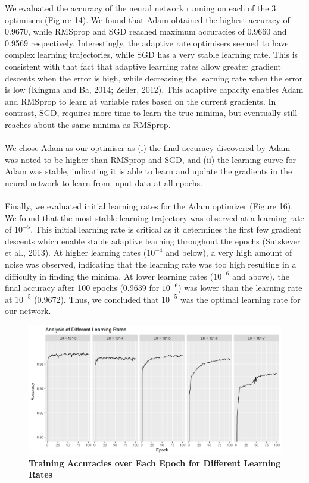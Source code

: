 \documentclass{article}
\begin{document}
We evaluated the accuracy of the neural network running on each of the 3 optimisers (Figure 14). We found that Adam obtained the highest accuracy of 0.9670, while RMSprop and SGD reached maximum accuracies of 0.9660 and 0.9569 respectively. Interestingly, the adaptive rate optimisers seemed to have complex learning trajectories, while SGD has a very stable learning rate. This is consistent with that fact that adaptive learning rates allow greater gradient descents when the error is high, while decreasing the learning rate when the error is low (Kingma and Ba, 2014; Zeiler, 2012). This adaptive capacity enables Adam and RMSprop to learn at variable rates based on the current gradients. In contrast, SGD, requires more time to learn the true minima, but eventually still reaches about the same minima as RMSprop.\\\\
We chose Adam as our optimiser as (i) the final accuracy discovered by Adam was noted to be higher than RMSprop and SGD, and (ii) the  learning curve for Adam was stable, indicating it is able to learn and update the gradients in the neural network to learn from input data at all epochs.\\\\
Finally, we evaluated initial learning rates for the Adam optimizer (Figure 16). We found that the most stable learning trajectory was observed at a learning rate of $10^{-5}$. This initial learning rate is critical as it determines the first few gradient descents which enable stable adaptive learning throughout the epochs (Sutskever et al., 2013). At higher learning rates ($10^{-4}$ and below), a very high amount of noise was observed, indicating that the learning rate was too high resulting in a difficulty in finding the minima. At lower learning rates ($10^{-6}$ and above), the final accuracy after 100 epochs (0.9639 for $10^{-6}$) was lower than the learning rate at $10^{-5}$ (0.9672). Thus, we concluded that $10^{-5}$ was the optimal learning rate for our network.
\begin{figure}[H]
\includegraphics[width=\textwidth]{learningrates.jpg}
\centering
\caption{\textbf{Training Accuracies over Each Epoch for Different Learning Rates}}
\end{figure}
\end{document}
